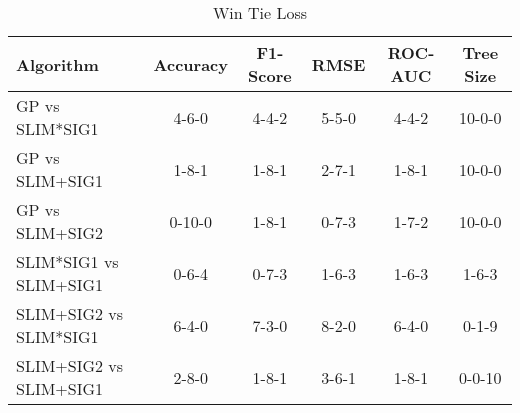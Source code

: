 
    \begin{table}[H]
        \centering
        \renewcommand{\arraystretch}{1.2}
        \caption{Win Tie Loss}
        \label{tab:comparison_test_wtl}
    \begin{tabular}{lccccc}
\toprule
Algorithm & Accuracy & F1-Score & RMSE & ROC-AUC & Tree Size \\
\midrule
GP vs SLIM*SIG1 & 4-6-0 & 4-4-2 & 5-5-0 & 4-4-2 & 10-0-0 \\
GP vs SLIM+SIG1 & 1-8-1 & 1-8-1 & 2-7-1 & 1-8-1 & 10-0-0 \\
GP vs SLIM+SIG2 & 0-10-0 & 1-8-1 & 0-7-3 & 1-7-2 & 10-0-0 \\
SLIM*SIG1 vs SLIM+SIG1 & 0-6-4 & 0-7-3 & 1-6-3 & 1-6-3 & 1-6-3 \\
SLIM+SIG2 vs SLIM*SIG1 & 6-4-0 & 7-3-0 & 8-2-0 & 6-4-0 & 0-1-9 \\
SLIM+SIG2 vs SLIM+SIG1 & 2-8-0 & 1-8-1 & 3-6-1 & 1-8-1 & 0-0-10 \\
\bottomrule
\end{tabular}

        
    \end{table}
    